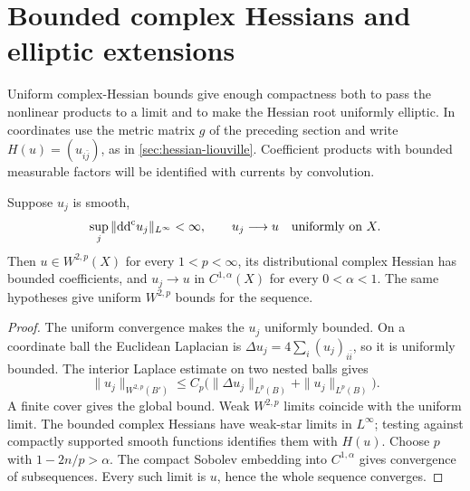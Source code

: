 \section{Bounded complex Hessians and elliptic extensions}
\label{sec:hessian-complex-limits}

Uniform complex-Hessian bounds give enough compactness both to pass the
nonlinear products to a limit and to make the Hessian root uniformly
elliptic. In coordinates use the metric matrix $g$ of the preceding
section and write $H(u)=(u_{i\bar j})$, as in \cref{sec:hessian-liouville}. Coefficient products with bounded
measurable factors will be identified with currents by convolution.

\begin{lemma}\label{hessian:complex-hessian-compactness}
Suppose $u_j$ is smooth,
\[
 \sup_j\|\mathrm{dd}^{\mathrm{c}} u_j\|_{L^\infty}<\infty,
 \qquad u_j\longrightarrow u\quad\text{uniformly on }X.
\]
Then $u\in W^{2,p}(X)$ for every $1<p<\infty$, its distributional complex
Hessian has bounded coefficients, and $u_j\to u$ in $C^{1,\alpha}(X)$
for every $0<\alpha<1$. The same hypotheses give uniform $W^{2,p}$ bounds
for the sequence.
\end{lemma}
\begin{proof}
The uniform convergence makes the $u_j$ uniformly bounded. On a
coordinate ball the Euclidean Laplacian is
$\Delta u_j=4\sum_i (u_j)_{i\bar i}$, so it is uniformly bounded.
The interior Laplace estimate on two nested balls gives
\[
 \|u_j\|_{W^{2,p}(B')}\leq C_p
       \bigl(\|\Delta u_j\|_{L^p(B)}+\|u_j\|_{L^p(B)}\bigr).
\]
A finite cover gives the global bound. Weak $W^{2,p}$ limits coincide
with the uniform limit. The bounded complex Hessians have weak-star
limits in $L^\infty$; testing against compactly supported smooth functions
identifies them with $H(u)$. Choose $p$ with $1-2n/p>\alpha$.
The compact Sobolev embedding into $C^{1,\alpha}$ gives convergence of
subsequences. Every such limit is $u$, hence the whole sequence converges.
\end{proof}

